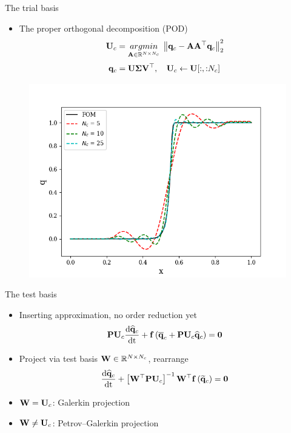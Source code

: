 \documentclass[]{beamer}
\begin{document}
\begin{frame}{The trial basis}
    \begin{itemize}
        \item The proper orthogonal decomposition (POD)
        \begin{equation*}
            \consTrial = \argmin{\dummyMatOne \in \mathbb{R}^{\numDOF \times \numConsvModes}} \norm{\consDataMat - \dummyMatOne \dummyMatOne^\top \consDataMat}_2^2
        \end{equation*}
        \begin{equation*}
            \consDataMat = \basisMat \singVecMat \rightSingVecMat^\top, \quad \consTrial \leftarrow \basisMat[:, {:}\numConsvModes]
        \end{equation*}
    \end{itemize}
	\vspace{-1em}
	\centering
	\begin{figure}
		\includegraphics[width=0.6\linewidth]{theory/podProfileConverge.png}
	\end{figure}
\end{frame}

\begin{frame}{The test basis}
    \begin{itemize}
        \item Inserting approximation, no order reduction yet
        \begin{equation*}
            \consScale \consTrial \ode{\consVecCoef}{\timeVar} + \rhsFunc{\consVecCent + \consScale \consTrial \consVecCoef} = \zeroVec 
        \end{equation*}
        \item Project via test basis $\testBasis \in \mathbb{R}^{\numDOF \times \numConsvModes}$, rearrange
        \begin{equation*}
            \ode{\consVecCoef}{\timeVar} + \left[ \testBasis^\top \consScale \consTrial \right]^{-1} \testBasis^\top \rhsFunc{\consVecRom} = \zeroVec
        \end{equation*}
        \item $\testBasis = \consTrial$: Galerkin projection
        \item $\testBasis \neq \consTrial$: Petrov--Galerkin projection 
    \end{itemize}
\end{frame}
\end{document}
